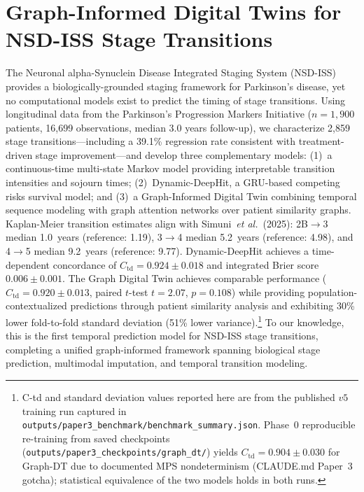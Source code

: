 
\chapter{Graph-Informed Digital Twins for NSD-ISS Stage Transitions}
\label{ch:paper3}\label{p3:ch:paper3}

The Neuronal alpha-Synuclein Disease Integrated Staging System (NSD-ISS) provides a biologically-grounded staging framework for Parkinson's disease, yet no computational models exist to predict the timing of stage transitions. Using longitudinal data from the Parkinson's Progression Markers Initiative ($n{=}1{,}900$ patients, 16,699 observations, median 3.0 years follow-up), we characterize 2,859 stage transitions---including a 39.1\% regression rate consistent with treatment-driven stage improvement---and develop three complementary models: (1)~a continuous-time multi-state Markov model providing interpretable transition intensities and sojourn times; (2)~Dynamic-DeepHit, a GRU-based competing risks survival model; and (3)~a Graph-Informed Digital Twin combining temporal sequence modeling with graph attention networks over patient similarity graphs. Kaplan-Meier transition estimates align with Simuni~\textit{et al.}~(2025): 2B$\to$3 median 1.0~years (reference: 1.19), 3$\to$4 median 5.2~years (reference: 4.98), and 4$\to$5 median 9.2~years (reference: 9.77). Dynamic-DeepHit achieves a time-dependent concordance of $C_\text{td}{=}0.924 \pm 0.018$ and integrated Brier score $0.006 \pm 0.001$. The Graph Digital Twin achieves comparable performance ($C_\text{td}{=}0.920 \pm 0.013$, paired $t$-test $t{=}2.07$, $p{=}0.108$) while providing population-contextualized predictions through patient similarity analysis and exhibiting 30\% lower fold-to-fold standard deviation (51\% lower variance).\footnote{C-td and standard deviation values reported here are from the published $v5$ training run captured in \texttt{outputs/paper3\_benchmark/benchmark\_summary.json}. Phase~0 reproducible re-training from saved checkpoints (\texttt{outputs/paper3\_checkpoints/graph\_dt/}) yields $C_\text{td}{=}0.904 \pm 0.030$ for Graph-DT due to documented MPS nondeterminism (CLAUDE.md Paper~3 gotcha); statistical equivalence of the two models holds in both runs.} To our knowledge, this is the first temporal prediction model for NSD-ISS stage transitions, completing a unified graph-informed framework spanning biological stage prediction, multimodal imputation, and temporal transition modeling.

